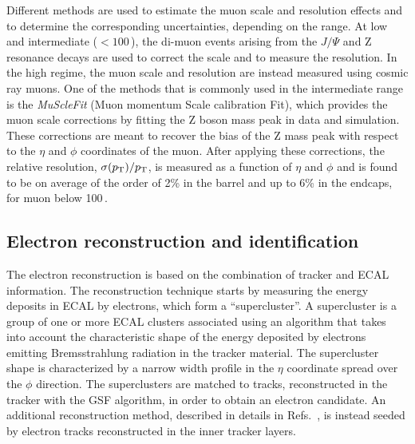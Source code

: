 Different methods are used to estimate the muon \pt scale and resolution effects and to determine the corresponding uncertainties, depending on the \pt range. At low and intermediate \pt ($< 100$\,\GeV), the di-muon events arising from the $J/\Psi$ and Z resonance decays are used to correct the \pt scale and to measure the \pt resolution. In the high \pt regime, the muon \pt scale and resolution are instead measured using cosmic ray muons. One of the methods that is commonly used in the intermediate \pt range is the \emph{MuScleFit} (Muon momentum Scale calibration Fit), which provides the muon \pt scale corrections by fitting the Z boson mass peak in data and simulation. These corrections are meant to recover the bias of the Z mass peak with respect to the $\eta$ and $\phi$ coordinates of the muon. After applying these corrections, the relative \pt resolution, $\sigma(p_\mathrm{T})/p_\mathrm{T}$, is measured as a function of $\eta$ and $\phi$ and is found to be on average of the order of 2\% in the barrel and up to 6\% in the endcaps, for muon \pt below 100\,\GeV.

\subsection{Electron reconstruction and identification}\label{sec:eleIdIso}

The electron reconstruction is based on the combination of tracker and ECAL information. The reconstruction technique starts by measuring the energy deposits in ECAL by electrons, which form a ``supercluster''. A supercluster is a group of one or more ECAL clusters associated using an algorithm that takes into account the characteristic shape of the energy deposited by electrons emitting Bremsstrahlung radiation in the tracker material. The supercluster shape is characterized by a narrow width profile in the $\eta$ coordinate spread over the $\phi$ direction. The superclusters are matched to tracks, reconstructed in the tracker with the GSF algorithm, in order to obtain an electron candidate. An additional reconstruction method, described in details in Refs.~\cite{CMS-PAS-EGM-10-004,Khachatryan:2015hwa}, is instead seeded by electron tracks reconstructed in the inner tracker layers.

